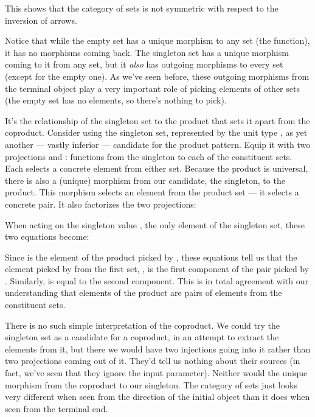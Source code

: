 This shows that the category of sets is not symmetric with respect to
the inversion of arrows.

Notice that while the empty set has a unique morphism to any set (the
 function), it has no morphisms coming back. The
singleton set has a unique morphism coming to it from any set, but it
\emph{also} has outgoing morphisms to every set (except for the empty
one). As we've seen before, these outgoing morphisms from the terminal
object play a very important role of picking elements of other sets (the
empty set has no elements, so there's nothing to pick).

It's the relationship of the singleton set to the product that sets it
apart from the coproduct. Consider using the singleton set, represented
by the unit type \code{()}, as yet another --- vastly inferior ---
candidate for the product pattern. Equip it with two projections
 and : functions from the singleton to each of the
constituent sets. Each selects a concrete element from either set.
Because the product is universal, there is also a (unique) morphism
 from our candidate, the singleton, to the product. This
morphism selects an element from the product set --- it selects a
concrete pair. It also factorizes the two projections:

When acting on the singleton value \code{()}, the only element of the
singleton set, these two equations become:

Since  is the element of the product picked by ,
these equations tell us that the element picked by  from the
first set, , is the first component of the pair picked by
. Similarly,  is equal to the second component.
This is in total agreement with our understanding that elements of the
product are pairs of elements from the constituent sets.

There is no such simple interpretation of the coproduct. We could try
the singleton set as a candidate for a coproduct, in an attempt to
extract the elements from it, but there we would have two injections
going into it rather than two projections coming out of it. They'd tell
us nothing about their sources (in fact, we've seen that they ignore the
input parameter). Neither would the unique morphism from the coproduct
to our singleton. The category of sets just looks very different when
seen from the direction of the initial object than it does when seen
from the terminal end.

